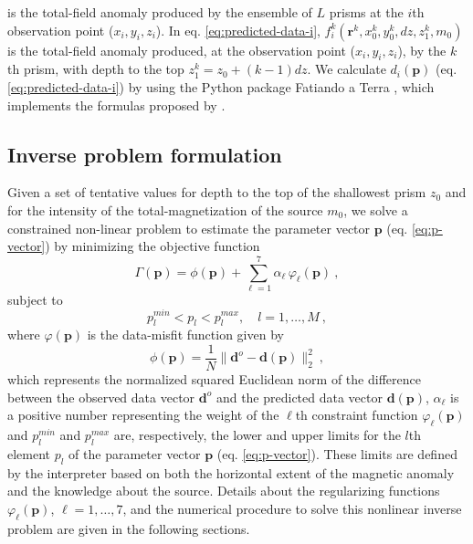 is the total-field anomaly produced by the ensemble of $L$ prisms at the $i$th observation point ($x_{i}, y_{i}, z_{i}$). 
In eq. \ref{eq:predicted-data-i}, $f_{i}^{k}(\mathbf{r}^{k}, x_{0}^{k}, y_{0}^{k}, dz, z_{1}^{k}, m_{0})$ is the total-field anomaly 
produced, at the observation point ($x_{i}, y_{i}, z_{i}$), by the $k$th prism, with depth to the top $z_{1}^{k} = z_{0} + (k-1)dz$.
We calculate $d_{i} (\mathbf{p})$ (eq. \ref{eq:predicted-data-i}) by using the Python package Fatiando a Terra \citep{uieda-etal2013}, 
which implements the formulas proposed by \cite{plouff1976}.

\subsection{Inverse problem formulation}

Given a set of tentative values for depth to the top of the shallowest prism $z_{0}$ and for the intensity of the 
total-magnetization of the source $m_{0}$, we solve a constrained non-linear problem to estimate the parameter 
vector $\mathbf{p}$ (eq. \ref{eq:p-vector}) by minimizing the objective function
\begin{equation}
\Gamma (\mathbf{p}) = \phi (\mathbf{p}) + \sum\limits^{7}_{\ell =1} \alpha_{\ell} \, \varphi_{\ell}(\mathbf{p}) \: ,
\label{eq:gamma}
\end{equation}
subject to
\begin{equation}
p_{l}^{min} < p_{l} < p_{l}^{max}, \quad l = 1, \dots, M \: ,
\label{eq:inequality-constraint}
\end{equation}
where $\varphi (\mathbf{p})$ is the data-misfit function given by
\begin{equation}\label{eq:misfit}
\phi (\mathbf{p}) = \frac{1}{N} \| \mathbf{d}^{o} - \mathbf{d}(\mathbf{p}) \|_{2}^{2} \: ,
\end{equation}
which represents the normalized squared Euclidean norm of the difference between the observed data vector $\mathbf{d}^{o}$ and 
the predicted data vector $\mathbf{d}(\mathbf{p})$, $\alpha_{\ell}$ is a positive number representing the weight of the 
$\ell$th constraint function $\varphi_{\ell}(\mathbf{p})$ and $p_{l}^{min}$ and $p_{l}^{max}$ are, respectively, the lower and 
upper limits for the $l$th element $p_{l}$ of the parameter vector $\mathbf{p}$ (eq. \ref{eq:p-vector}). 
These limits are defined by the interpreter based on both the horizontal extent of the magnetic anomaly and the knowledge 
about the source. Details about the regularizing functions $\varphi_\ell(\mathbf{p})$, $\ell = 1, \dots, 7$, and the numerical procedure to solve this nonlinear inverse problem are given in the following sections.

